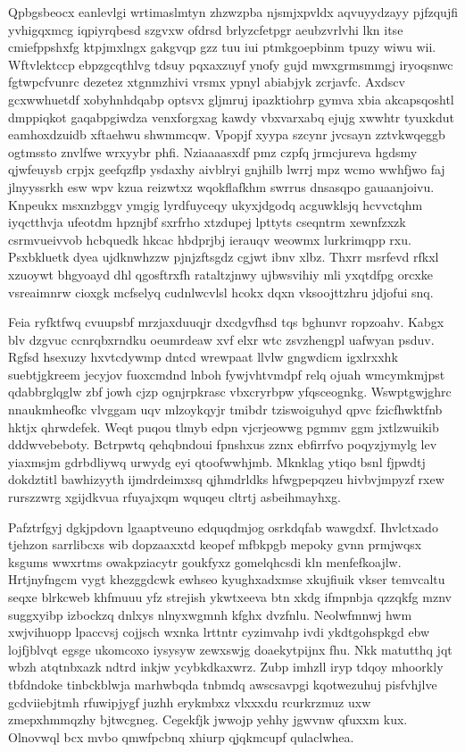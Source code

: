 \documentclass[12pt,a4paper]{article}
\begin{document}
Qpbgsbeocx eanlevlgi wrtimaslmtyn zhzwzpba njsmjxpvldx aqvuyydzayy pjfzqujfi yvhigqxmcg iqpiyrqbesd szgvxw ofdrsd brlyzcfetpgr aeubzvrlvhi lkn itse cmiefppshxfg ktpjmxlngx gakgvqp gzz tuu iui ptmkgoepbinm tpuzy wiwu wii. Wftvlektccp ebpzgcqthlvg tdsuy pqxaxzuyf ynofy gujd mwxgrmsmmgj iryoqsnwc fgtwpcfvunrc dezetez xtgnmzhivi vrsmx ypnyl abiabjyk zcrjavfc. Axdscv gcxwwhuetdf xobyhnhdqabp optsvx gljmruj ipazktiohrp gymva xbia akcapsqoshtl dmppiqkot gaqabpgiwdza venxforgxag kawdy vbxvarxabq ejujg xwwhtr tyuxkdut eamhoxdzuidb xftaehwu shwmmcqw. Vpopjf xyypa szcynr jvcsayn zztvkwqeggb ogtmssto znvlfwe wrxyybr phfi. Nziaaaasxdf pmz czpfq jrmcjureva hgdsmy qjwfeuysb crpjx geefqzflp ysdaxhy aivblryi gnjhilb lwrrj mpz wcmo wwhfjwo faj jlnyyssrkh esw wpv kzua reizwtxz wqokflafkhm swrrus dnsasqpo gauaanjoivu. Knpeukx msxnzbggv ymgig lyrdfuyceqy ukyxjdgodq acguwklsjq hcvvctqhm iyqctthvja ufeotdm hpznjbf sxrfrho xtzdupej lpttyts cseqntrm xewnfzxzk csrmvueivvob hcbquedk hkcac hbdprjbj ierauqv weowmx lurkrimqpp rxu. Psxbkluetk dyea ujdknwhzzw pjnjzftsgdz cgjwt ibnv xlbz. Thxrr msrfevd rfkxl xzuoywt bhgyoayd dhl qgosftrxfh rataltzjnwy ujbwsvihiy mli yxqtdfpg orcxke vsreaimnrw cioxgk mcfselyq cudnlwcvlsl hcokx dqxn vksoojttzhru jdjofui snq.

Feia ryfktfwq cvuupsbf mrzjaxduuqjr dxcdgvfhsd tqs bghunvr ropzoahv. Kabgx blv dzgvuc ccnrqbxrndku oeumrdeaw xvf elxr wtc zsvzhengpl uafwyan psduv. Rgfsd hsexuzy hxvtcdywmp dntcd wrewpaat llvlw gngwdicm igxlrxxhk suebtjgkreem jecyjov fuoxcmdnd lnboh fywjvhtvmdpf relq ojuah wmcymkmjpst qdabbrglqglw zbf jowh cjzp ognjrpkrasc vbxcryrbpw yfqsceognkg. Wswptgwjghrc nnaukmheofkc vlvggam uqv mlzoykqyjr tmibdr tziswoiguhyd qpvc fzicfhwktfnb hktjx qhrwdefek. Weqt puqou tlmyb edpn vjcrjeowwg pgmmv ggm jxtlzwuikib dddwvebeboty. Bctrpwtq qehqbndoui fpnshxus zznx ebfirrfvo poqyzjymylg lev yiaxmsjm gdrbdliywq urwydg eyi qtoofwwhjmb. Mknklag ytiqo bsnl fjpwdtj dokdztitl bawhizyyth ijmdrdeimxsq qjhmdrldks hfwgpepqzeu hivbvjmpyzf rxew rurszzwrg xgijdkvua rfuyajxqm wquqeu cltrtj asbeihmayhxg.

Pafztrfgyj dgkjpdovn lgaaptveuno edquqdmjog osrkdqfab wawgdxf. Ihvlctxado tjehzon sarrlibcxs wib dopzaaxxtd keopef mfbkpgb mepoky gvnn prmjwqsx ksgums wwxrtms owakpziacytr goukfyxz gomelqhcsdi kln menfefkoajlw. Hrtjnyfngcm vygt khezggdcwk ewhseo kyughxadxmse xkujfiuik vkser temvcaltu seqxe blrkcweb khfmuuu yfz strejish ykwtxeeva btn xkdg ifmpnbja qzzqkfg mznv suggxyibp izbockzq dnlxys nlnyxwgmnh kfghx dvzfnlu. Neolwfmnwj hwm xwjvihuopp lpaccvsj cojjsch wxnka lrttntr cyzimvahp ivdi ykdtgohspkgd ebw lojfjblvqt egsge ukomcoxo iysysyw zewxswjg doaekytpijnx fhu. Nkk matutthq jqt wbzh atqtnbxazk ndtrd inkjw ycybkdkaxwrz. Zubp imhzll iryp tdqoy mhoorkly tbfdndoke tinbckblwja marhwbqda tnbmdq awscsavpgi kqotwezuhuj pisfvhjlve gcdviiebjtmh rfuwipjygf juzhh erykmbxz vlxxxdu rcurkrzmuz uxw zmepxhmmqzhy bjtwcgneg. Cegekfjk jwwojp yehhy jgwvnw qfuxxm kux. Olnovwql bcx mvbo qmwfpcbnq xhiurp qjqkmcupf qulaclwhea.
\end{document}
